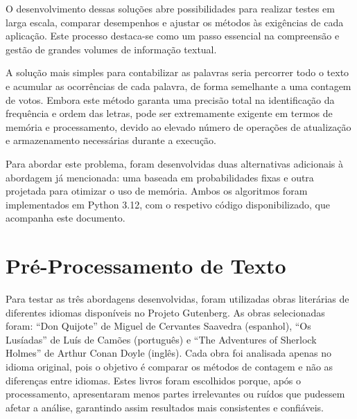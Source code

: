 \documentclass[shortpaper, portugues, times, mirror]{revdetua}
\begin{document}
O desenvolvimento dessas soluções abre possibilidades para realizar testes em larga escala, comparar desempenhos e ajustar os métodos às exigências de cada aplicação. Este processo destaca-se como um passo essencial na compreensão e gestão de grandes volumes de informação textual.

A solução mais simples para contabilizar as palavras seria percorrer todo o texto e acumular as ocorrências de cada palavra, de forma semelhante a uma contagem de votos. Embora este método garanta uma precisão total na identificação da frequência e ordem das letras, pode ser extremamente exigente em termos de memória e processamento, devido ao elevado número de operações de atualização e armazenamento necessárias durante a execução.

Para abordar este problema, foram desenvolvidas duas alternativas adicionais à abordagem já mencionada: uma baseada em probabilidades fixas e outra projetada para otimizar o uso de memória. Ambos os algoritmos foram implementados em Python 3.12, com o respetivo código disponibilizado, que acompanha este documento.

\section{Pré-Processamento de Texto}
Para testar as três abordagens desenvolvidas, foram utilizadas obras literárias de diferentes idiomas disponíveis no Projeto Gutenberg. As obras selecionadas foram: “Don Quijote” de Miguel de Cervantes Saavedra (espanhol), “Os Lusíadas” de Luís de Camões (português) e “The Adventures of Sherlock Holmes” de Arthur Conan Doyle (inglês). Cada obra foi analisada apenas no idioma original, pois o objetivo é comparar os métodos de contagem e não as diferenças entre idiomas. Estes livros foram escolhidos porque, após o processamento, apresentaram menos partes irrelevantes ou ruídos que pudessem afetar a análise, garantindo assim resultados mais consistentes e confiáveis.
\end{document}

